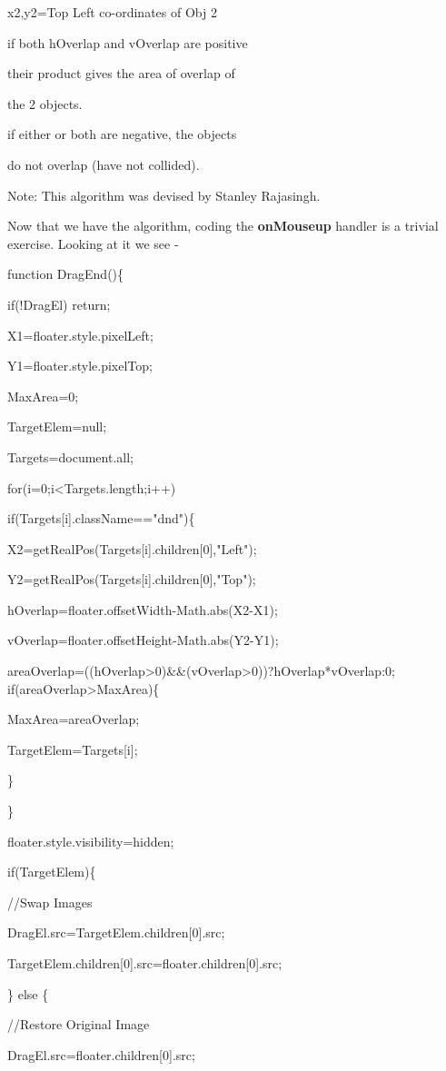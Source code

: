 \documentclass[
]{article}
\begin{document}
x2,y2=Top Left co-ordinates of Obj 2

if both hOverlap and vOverlap are positive

their product gives the area of overlap of

the 2 objects.

if either or both are negative, the objects

do not overlap (have not collided).

Note: This algorithm was devised by Stanley Rajasingh.

Now that we have the algorithm, coding the \textbf{onMouseup} handler is
a trivial exercise. Looking at it we see -

function DragEnd()\{

if(!DragEl) return;

X1=floater.style.pixelLeft;

Y1=floater.style.pixelTop;

MaxArea=0;

TargetElem=null;

Targets=document.all;

for(i=0;i\textless Targets.length;i++)

if(Targets{[}i{]}.className=="dnd")\{

X2=getRealPos(Targets{[}i{]}.children{[}0{]},"Left");

Y2=getRealPos(Targets{[}i{]}.children{[}0{]},"Top");

hOverlap=floater.offsetWidth-Math.abs(X2-X1);

vOverlap=floater.offsetHeight-Math.abs(Y2-Y1);

areaOverlap=((hOverlap\textgreater0)\&\&(vOverlap\textgreater0))?hOverlap*vOverlap:0;
if(areaOverlap\textgreater MaxArea)\{

MaxArea=areaOverlap;

TargetElem=Targets{[}i{]};

\}

\}

floater.style.visibility=\textquotesingle hidden\textquotesingle;

if(TargetElem)\{

//Swap Images

DragEl.src=TargetElem.children{[}0{]}.src;

TargetElem.children{[}0{]}.src=floater.children{[}0{]}.src;

\} else \{

//Restore Original Image

DragEl.src=floater.children{[}0{]}.src;
\end{document}
